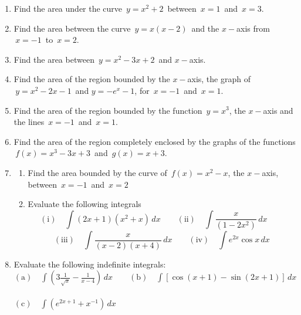 \documentclass[11pt,a4paper]{article}
\theoremstyle{definition}
\begin{document}
\begin{enumerate}
\item Find the area under the curve $\, y = x^2 + 2\, $ between $\, x = 1\,$ and $\, x = 3$.

\item Find the area between the curve $\, y = x ( x - 2)\,$ and the $x-$axis from $\, x = -1\,$ to $\, x = 2$.

\item Find the area between $\, y = x^2 - 3x + 2\,$ and $x-$axis.

\item Find the area of the region bounded by the $x-$axis, the graph of $\, y = x^2 - 2x - 1\,$ and $y = -e^x - 1$, for $\, x = -1\,$ and $\, x = 1$.

\item Find the area of the region bounded by the function $\, y = x^3$, the $x-$axis and the lines $\, x = -1\,$ and $\, x = 1$.

\item Find the area of the region completely enclosed by the graphs of the functions $\, f(x) = x^3 - 3x + 3\,$ and $\, g(x) = x + 3$.

\item 
\begin{enumerate}
    \item Find the area bounded by the curve of $\, f(x) = x^2 - x$, the $x-$axis, between $\, x = -1\,$ and $\, x = 2$
    
    \item Evaluate the following integrals
    $$(\text{i})\quad  \int \left(2x + 1\right)\left(x^2 + x\right)\,dx \qquad  (\text{ii})\quad  \int \frac{x}{\left(1 - 2x^2\right)}\,dx\qquad $$ $$(\text{iii})\quad  \int \frac{x}{\left(x - 2\right)\left(x + 4\right)}\,dx\qquad  (\text{iv})\quad  \displaystyle{\int e^{2x}\cos x \,dx}$$
\end{enumerate}


\item Evaluate the following indefinite integrals:\\

$\displaystyle{(\text{a})\quad  \int \left(3\frac{1}{\sqrt{x}} - \frac{1}{x - 4}\right)\,dx\qquad  (\text{b})\quad  \int\left[\cos \left(x + 1\right) - \sin \left(2x + 1\right)\right]\,dx}$\\\\


$\displaystyle{(\text{c})\quad  \int \left(e^{2x + 1} + x^{-1}\right)\,dx}$\\




\end{enumerate}
\end{document}
